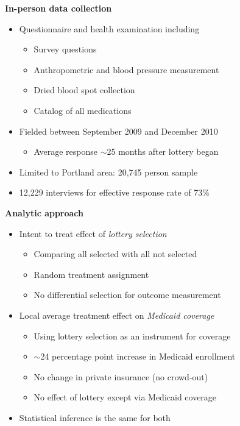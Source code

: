 \documentclass[notes=show]{beamer}
\begin{document}
\begin{frame}[plain]
	\begin{center}
	\textbf{In-person data collection}
	\end{center}
	
	\begin{itemize}
	\item Questionnaire and health examination including
		\begin{itemize}
		\item Survey questions
		\item Anthropometric and blood pressure measurement
		\item Dried blood spot collection
		\item Catalog of all medications
		\end{itemize}
	\item Fielded between September 2009 and December 2010
		\begin{itemize}
		\item Average response $\sim$25 months after lottery began
		\end{itemize}
	\item Limited to Portland area: 20,745 person sample
	\item 12,229 interviews for effective response rate of 73\%
	\end{itemize}
\end{frame}

\begin{frame}[plain]
	\begin{center}
	\textbf{Analytic approach}
	\end{center}
	
	\begin{itemize}
	\item Intent to treat effect of \emph{lottery selection}
		\begin{itemize}
		\item Comparing all selected with all not selected
		\item Random treatment assignment
		\item No differential selection for outcome measurement
		\end{itemize}
	\item Local average treatment effect on \emph{Medicaid coverage}
		\begin{itemize}
		\item Using lottery selection as an instrument for coverage
		\item $\sim$24 percentage point increase in Medicaid enrollment
		\item No change in private insurance (no crowd-out)
		\item No effect of lottery except via Medicaid coverage
		\end{itemize}
	\item Statistical inference is the same for both
	\end{itemize}
\end{frame}
\end{document}
